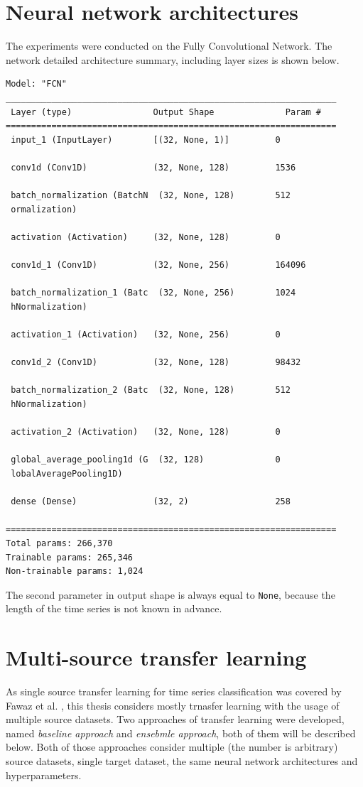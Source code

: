 \documentclass[a4paper,11pt,twoside]{report}
\theoremstyle{definition}
\begin{document}
\section{Neural network architectures}
The experiments were conducted on the Fully Convolutional Network. The network detailed architecture summary, including layer sizes is shown below. \begin{verbatim}
Model: "FCN"
_________________________________________________________________
 Layer (type)                Output Shape              Param #
=================================================================
 input_1 (InputLayer)        [(32, None, 1)]         0

 conv1d (Conv1D)             (32, None, 128)         1536

 batch_normalization (BatchN  (32, None, 128)        512
 ormalization)

 activation (Activation)     (32, None, 128)         0

 conv1d_1 (Conv1D)           (32, None, 256)         164096

 batch_normalization_1 (Batc  (32, None, 256)        1024
 hNormalization)

 activation_1 (Activation)   (32, None, 256)         0

 conv1d_2 (Conv1D)           (32, None, 128)         98432

 batch_normalization_2 (Batc  (32, None, 128)        512
 hNormalization)

 activation_2 (Activation)   (32, None, 128)         0

 global_average_pooling1d (G  (32, 128)              0
 lobalAveragePooling1D)

 dense (Dense)               (32, 2)                 258

=================================================================
Total params: 266,370
Trainable params: 265,346
Non-trainable params: 1,024
\end{verbatim}
The second parameter in output shape is always equal to \texttt{None}, because the length of the time series is not known in advance.
\section{Multi-source transfer learning}
As single source transfer learning for time series classification was covered by Fawaz et al. \cite{transfer_learning_time_series}, this thesis considers mostly trnasfer learning with the usage of multiple source datasets. Two approaches of transfer learning were developed, named \textit{baseline approach} and \textit{ensebmle approach}, both of them will be described below. Both of those approaches consider multiple (the number is arbitrary) source datasets, single target dataset, the same neural network architectures and hyperparameters.
\end{document}
